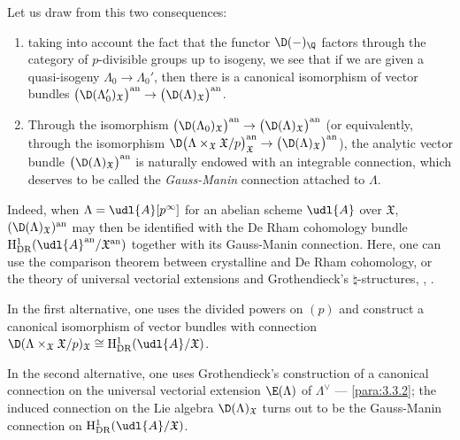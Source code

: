 \begin{para}\label{para:3.6.7} Let us draw from this two consequences:
 \begin{enumerate}
  \item taking into account the fact that the functor $\D(-)_\Q$ factors
	through the category of $p$-divisible
	groups up to isogeny, we see that if we are given a quasi-isogeny
	$\Lambda_0\rightarrow \Lambda_0'$, then there is a
	canonical isomorphism of vector bundles
	$\bigl(\D(\Lambda'_0)_{\mathfrak{X}}\bigr)^{\mathrm{an}}\rightarrow
	\bigl(\D(\Lambda)_{\mathfrak{X}}\bigr)^{\mathrm{an}}$.
  \item Through the isomorphism
	$\bigl(\D(\Lambda_0)_{\mathfrak{X}}\bigr)^{\mathrm{an}}\rightarrow
	\bigl(\D(\Lambda)_{\mathfrak{X}}\bigr)^{\mathrm{an}}$ (or equivalently,
	through the isomorphism
	$\D\bigl(\Lambda\times_{\mathfrak{X}}
	\mathfrak{X}/p\bigr)_{\mathfrak{X}}^{\mathrm{an}}
	\rightarrow
	\bigl(\D(\Lambda)_{\mathfrak{X}}\bigr)^{\mathrm{an}}$), the 
	analytic vector bundle
	$\bigl(\D(\Lambda)_{\mathfrak{X}}\bigr)^{\mathrm{an}}$ is naturally
	endowed with an integrable connection, which deserves to be
	called the {\it Gauss-Manin} connection attached to $\Lambda$.
 \end{enumerate}

 Indeed, when $\Lambda=\udl{A}[p^\infty]$ for an abelian scheme
 $\udl{A}$ over $\mathfrak{X}$,
 $(\D(\Lambda)_{\mathfrak{X}})^{\mathrm{an}}$ may then be identified
 with the De Rham cohomology bundle
 $\mathrm{H}^1_{\mathrm{DR}}(\udl{A}^{\mathrm{an}}/
 {\mathfrak{X}}^{\mathrm{an}})$
 together with its Gauss-Manin connection.  Here, one can use the
 comparison theorem between crystalline and De Rham cohomology, or the
 theory of universal vectorial extensions and Grothendieck's
 $\natural$-structures, \cf \cite{mazur74:_univer}, \cite{tddc2}.

 In the first alternative, one uses the
 divided powers on $(p)$ and construct a canonical isomorphism of vector
 bundles with connection 
 $\D(\Lambda\times_{\mathfrak{X}}\mathfrak{X}/p)_{\mathfrak{X}}\cong
 \mathrm{H}^1_{\mathrm{DR}}(\udl{A}/{\mathfrak{X}})$.


 In the second alternative, one uses Grothendieck's construction of a
 canonical connection on the universal vectorial extension $\E(\Lambda)$
 of $\Lambda^\vee$ --- \cf \ref{para:3.3.2}; the induced connection on the Lie
 algebra $\D(\Lambda)_{\mathfrak{X}}$ turns out to be the Gauss-Manin
 connection on $ \mathrm{H}^1_{\mathrm{DR}}(\udl{A}/{\mathfrak{X}})$.



\end{para}
